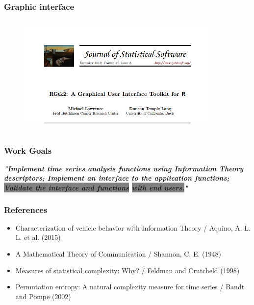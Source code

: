 \documentclass[10pt, compress]{beamer}
\begin{document}
\begin{frame}[fragile]
\frametitle{Graphic interface}
\begin{figure}
  \centering
   \includegraphics[width=10cm,height=6cm]{rgtk2.png}
\end{figure}
\end{frame}

\begin{frame}[fragile]
\frametitle{Work Goals}

\textit{\textbf{\Large "Implement time series analysis functions using Information Theory descriptors; Implement an interface to the application functions; \colorbox{gray}{Validate the interface and functions} \colorbox{gray}{with end users.}"}}

\end{frame}

\begin{frame}[fragile]
  \frametitle{References}
\begin{itemize}

\item{Characterization of vehicle behavior with Information Theory / Aquino, A. L. L. et al. (2015)}

\item{A Mathematical Theory of Communication / Shannon, C. E. (1948)}

\item{Measures of statistical complexity: Why? / Feldman and Crutcheld (1998)}

\item{Permutation entropy: A natural complexity measure for time series / Bandt and Pompe (2002)}

\end{itemize}
\end{frame}

\end{document}
